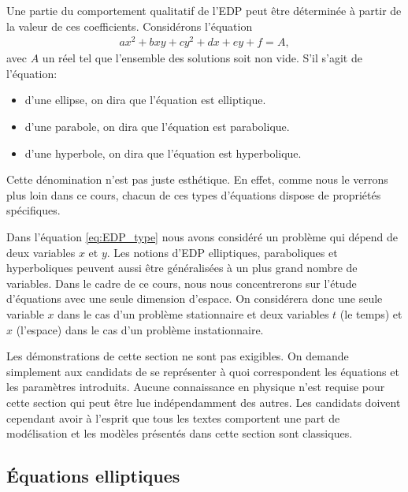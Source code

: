 \documentclass[12pt,a4paper,twoside]{article}
\begin{document}
Une partie du comportement qualitatif de l'EDP peut \^etre d\'etermin\'ee
\`a partir de la valeur de ces coefficients.
Consid\'erons l'\'equation
\begin{align}
  \label{eq:EDP_geom}
  a x^2 + b xy + c y^2 + d x + e y + f = A ,
\end{align}
avec $A$ un r\'eel tel que l'ensemble des solutions soit non vide.
S'il s'agit de l'\'equation:
\begin{itemize}
\item d'une ellipse, on dira que l'\'equation est elliptique.
\item d'une parabole, on dira que l'\'equation est parabolique.
\item d'une hyperbole, on dira que l'\'equation est hyperbolique.
\end{itemize}
Cette d\'enomination n'est pas juste esth\'etique.
En effet, comme nous le verrons plus loin dans ce cours,
chacun de ces types d'\'equations dispose de propri\'et\'es sp\'ecifiques.

Dans l'\'equation \eqref{eq:EDP_type}
nous avons consid\'er\'e un probl\`eme qui d\'epend de deux
variables $x$ et $y$. 
Les notions d'EDP elliptiques, paraboliques et hyperboliques peuvent
aussi \^etre g\'en\'eralis\'ees \`a un plus grand nombre de variables.
Dans le cadre de ce cours, nous nous concentrerons 
sur l'\'etude d'\'equations
avec une seule dimension d'espace.
On consid\'erera donc une seule variable $x$ dans le cas d'un probl\`eme stationnaire
et deux variables $t$ (le temps) et $x$ (l'espace) dans le cas d'un probl\`eme
instationnaire.




\begin{remark}
  Les d\'emonstrations de cette section ne sont pas exigibles.
  On demande simplement aux candidats de se repr\'esenter \`a quoi
  correspondent les \'equations et les param\`etres introduits.
  Aucune connaissance en physique n'est requise pour cette section
  qui peut \^etre lue ind\'ependamment des autres.
  Les candidats doivent cependant avoir \`a l'esprit que tous les textes
  comportent une part de mod\'elisation et les mod\`eles pr\'esent\'es dans cette
  section sont classiques.
\end{remark}



\subsection{\'Equations elliptiques}
\label{subsec:elliptique}
\end{document}
